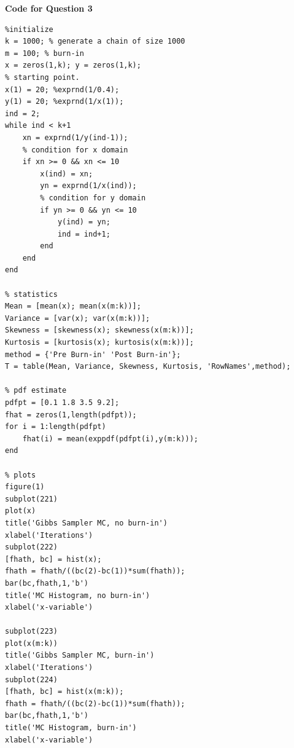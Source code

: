 \documentclass[12pt,a4paper]{article}
\begin{document}
\textbf{Code for Question 3}\\
\begin{verbatim}
%initialize
k = 1000; % generate a chain of size 1000
m = 100; % burn-in
x = zeros(1,k); y = zeros(1,k);
% starting point.
x(1) = 20; %exprnd(1/0.4); 
y(1) = 20; %exprnd(1/x(1));
ind = 2;
while ind < k+1
    xn = exprnd(1/y(ind-1));
    % condition for x domain
    if xn >= 0 && xn <= 10
        x(ind) = xn;
        yn = exprnd(1/x(ind));
        % condition for y domain
        if yn >= 0 && yn <= 10
            y(ind) = yn;
            ind = ind+1;
        end
    end
end

% statistics
Mean = [mean(x); mean(x(m:k))];
Variance = [var(x); var(x(m:k))];
Skewness = [skewness(x); skewness(x(m:k))];
Kurtosis = [kurtosis(x); kurtosis(x(m:k))];
method = {'Pre Burn-in' 'Post Burn-in'};
T = table(Mean, Variance, Skewness, Kurtosis, 'RowNames',method);

% pdf estimate
pdfpt = [0.1 1.8 3.5 9.2];
fhat = zeros(1,length(pdfpt));
for i = 1:length(pdfpt)
    fhat(i) = mean(exppdf(pdfpt(i),y(m:k)));
end

% plots
figure(1)
subplot(221)
plot(x)
title('Gibbs Sampler MC, no burn-in')
xlabel('Iterations')
subplot(222)
[fhath, bc] = hist(x);
fhath = fhath/((bc(2)-bc(1))*sum(fhath));
bar(bc,fhath,1,'b')
title('MC Histogram, no burn-in')
xlabel('x-variable')

subplot(223)
plot(x(m:k))
title('Gibbs Sampler MC, burn-in')
xlabel('Iterations')
subplot(224)
[fhath, bc] = hist(x(m:k));
fhath = fhath/((bc(2)-bc(1))*sum(fhath));
bar(bc,fhath,1,'b')
title('MC Histogram, burn-in')
xlabel('x-variable')
\end{verbatim}
\clearpage



\end{document}
